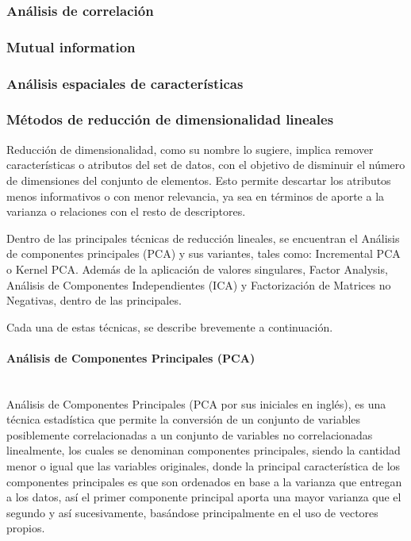 \subsubsection{Análisis de correlación}

\subsubsection{Mutual information}

\subsubsection{Análisis espaciales de características}

\subsubsection{Métodos de reducción de dimensionalidad lineales}

Reducción de dimensionalidad, como su nombre lo sugiere, implica remover características o atributos del set de datos, con el objetivo de disminuir el número de dimensiones del conjunto de elementos. Esto permite descartar los atributos menos informativos o con menor relevancia, ya sea en términos de aporte a la varianza o relaciones con el resto de descriptores.

Dentro de las principales técnicas de reducción lineales, se encuentran el Análisis de componentes principales (PCA) y sus variantes, tales como: Incremental PCA o Kernel PCA. Además de la aplicación de valores singulares, Factor Analysis, Análisis de Componentes Independientes (ICA) y Factorización de Matrices no Negativas, dentro de las principales.

Cada una de estas técnicas, se describe brevemente a continuación.

\paragraph{Análisis de Componentes Principales (PCA)\\\\}

Análisis de Componentes Principales (PCA por sus iniciales en inglés), es una técnica estadística que permite la conversión de un conjunto de variables posiblemente correlacionadas a un conjunto de variables no correlacionadas linealmente, los cuales se denominan componentes principales, siendo la cantidad menor o igual que las variables originales, donde la principal característica de los componentes principales es que son ordenados en base a la varianza que entregan a los datos, así el primer componente principal aporta una mayor varianza que el segundo y así sucesivamente, basándose principalmente en el uso de vectores propios.

